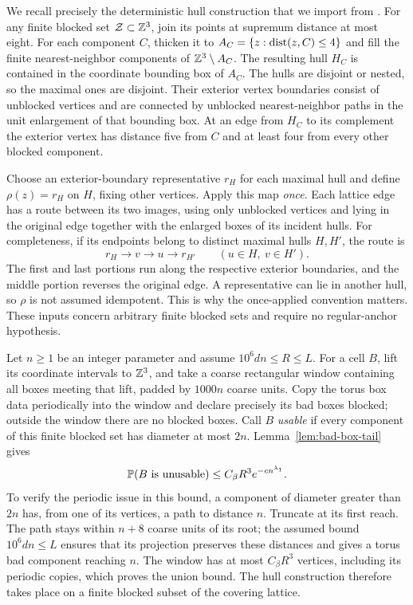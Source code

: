 We recall precisely the deterministic hull construction that we
import from \cite[Lemma~6.1 and Section~6.1, Equations~(6.2)--(6.3)]{Ord}.
For any finite blocked set $\mathcal Z\subset\mathbb Z^3$, join its
points at supremum distance at most eight.  For each component $C$,
thicken it to $A_C=\{z:\operatorname{dist}(z,C)\le4\}$ and fill the finite
nearest-neighbor components of $\mathbb Z^3\setminus A_C$.  The resulting
hull $H_C$ is contained in the coordinate bounding box of $A_C$.
The hulls are disjoint or nested, so the maximal ones are disjoint.
Their exterior vertex boundaries consist of unblocked vertices and
are connected by unblocked nearest-neighbor paths in the unit
enlargement of that bounding box.  At an edge from $H_C$ to its
complement the exterior vertex has distance five from $C$ and at
least four from every other blocked component.

Choose an exterior-boundary representative $r_H$ for each maximal
hull and define $\rho(z)=r_H$ on $H$, fixing other vertices.
Apply this map \emph{once}.  Each lattice edge has a route between
its two images, using only unblocked vertices and lying in the
original edge together with the enlarged boxes of its incident
hulls.  For completeness, if its endpoints belong to distinct
maximal hulls $H,H'$, the route is
\[
 r_H\longrightarrow v\longrightarrow u\longrightarrow r_{H'}
 \qquad(u\in H,\ v\in H').
\]
The first and last portions run along the respective exterior
boundaries, and the middle portion reverses the original edge.
A representative can lie in another hull, so $\rho$ is not assumed
idempotent.  This is why the once-applied convention matters.
These inputs concern arbitrary finite blocked sets and require no
regular-anchor hypothesis.

Let $n\ge1$ be an integer parameter and assume $10^6dn\le R\le L$.
For a cell $B$, lift its coordinate intervals to $\mathbb Z^3$, and take
a coarse rectangular window containing all boxes meeting that lift,
padded by $1000n$ coarse units.  Copy the torus box data periodically
into the window and declare precisely its bad boxes blocked; outside
the window there are no blocked boxes.  Call $B$ \emph{usable} if
every component of this finite blocked set has diameter at most
$2n$.  Lemma~\ref{lem:bad-box-tail} gives
\begin{equation}\label{eq:unusable-cell}
 \mathbb P(B\text{ is unusable})
 \le C_\beta R^3e^{-cn^{\lambda_1}}.
\end{equation}
To verify the periodic issue in this bound, a component of diameter
greater than $2n$ has, from one of its vertices, a path to distance
$n$.  Truncate at its first reach.  The path stays within $n+8$
coarse units of its root; the assumed bound $10^6dn\le L$ ensures
that its projection preserves
these distances and gives a torus bad component reaching $n$.
The window has at most $C_\beta R^3$ vertices, including its periodic
copies, which proves the union bound.  The hull construction therefore
takes place on a finite blocked subset of the covering lattice.

